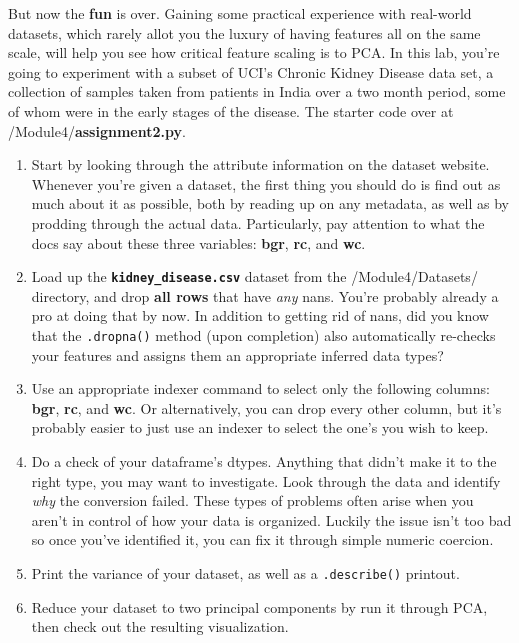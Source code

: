 \documentclass[11pt]{article}
\providecommand{\tightlist}{%
      \setlength{\itemsep}{0pt}\setlength{\parskip}{0pt}}
\begin{document}
But now the \textbf{fun} is over. Gaining some practical experience with
real-world datasets, which rarely allot you the luxury of having
features all on the same scale, will help you see how critical feature
scaling is to PCA. In this lab, you're going to experiment with a subset
of UCI's Chronic Kidney Disease data set, a collection of samples taken
from patients in India over a two month period, some of whom were in the
early stages of the disease. The starter code over at
/Module4/\textbf{assignment2.py}.

\begin{enumerate}
\def\labelenumi{\arabic{enumi}.}
\tightlist
\item
  Start by looking through the attribute information on the dataset
  website. Whenever you're given a dataset, the first thing you should
  do is find out as much about it as possible, both by reading up on any
  metadata, as well as by prodding through the actual data.
  Particularly, pay attention to what the docs say about these three
  variables: \textbf{bgr}, \textbf{rc}, and \textbf{wc}.
\item
  Load up the \textbf{\texttt{kidney\_disease.csv}} dataset from the
  /Module4/Datasets/ directory, and drop \textbf{all rows} that have
  \emph{any} nans. You're probably already a pro at doing that by now.
  In addition to getting rid of nans, did you know that the
  \texttt{.dropna()} method (upon completion) also automatically
  re-checks your features and assigns them an appropriate inferred data
  types?
\item
  Use an appropriate indexer command to select only the following
  columns: \textbf{bgr}, \textbf{rc}, and \textbf{wc}. Or alternatively,
  you can drop every other column, but it's probably easier to just use
  an indexer to select the one's you wish to keep.
\item
  Do a check of your dataframe's dtypes. Anything that didn't make it to
  the right type, you may want to investigate. Look through the data and
  identify \emph{why} the conversion failed. These types of problems
  often arise when you aren't in control of how your data is organized.
  Luckily the issue isn't too bad so once you've identified it, you can
  fix it through simple numeric coercion.
\item
  Print the variance of your dataset, as well as a \texttt{.describe()}
  printout.
\item
  Reduce your dataset to two principal components by run it through PCA,
  then check out the resulting visualization.
\end{enumerate}
\end{document}
